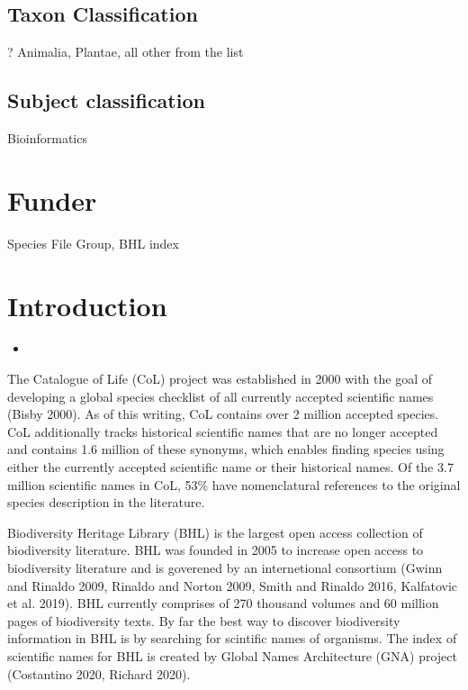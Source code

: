 \documentclass[
]{article}
\providecommand{\tightlist}{%
  \setlength{\itemsep}{0pt}\setlength{\parskip}{0pt}}
\begin{document}
\hypertarget{taxon-classification}{%
\subsection{Taxon Classification}\label{taxon-classification}}

? Animalia, Plantae, all other from the list

\hypertarget{subject-classification}{%
\subsection{Subject classification}\label{subject-classification}}

Bioinformatics

\hypertarget{funder}{%
\section{Funder}\label{funder}}

Species File Group, BHL index

\hypertarget{introduction}{%
\section{Introduction}\label{introduction}}

\begin{itemize}
\item
\end{itemize}

The Catalogue of Life (CoL) project was established in 2000 with the
goal of developing a global species checklist of all currently accepted
scientific names (Bisby 2000). As of this writing, CoL contains over 2
million accepted species. CoL additionally tracks historical scientific
names that are no longer accepted and contains 1.6 million of these
synonyms, which enables finding species using either the currently
accepted scientific name or their historical names. Of the 3.7 million
scientific names in CoL, 53\% have nomenclatural references to the
original species description in the literature.

Biodiversity Heritage Library (BHL) is the largest open access
collection of biodiversity literature. BHL was founded in 2005 to
increase open access to biodiversity literature and is goverened by an
internetional consortium (Gwinn and Rinaldo 2009, Rinaldo and Norton
2009, Smith and Rinaldo 2016, Kalfatovic et al. 2019). BHL currently
comprises of 270 thousand volumes and 60 million pages of biodiversity
texts. By far the best way to discover biodiversity information in BHL
is by searching for scintific names of organisms. The index of
scientific names for BHL is created by Global Names Architecture (GNA)
project (Costantino 2020, Richard 2020).
\end{document}
